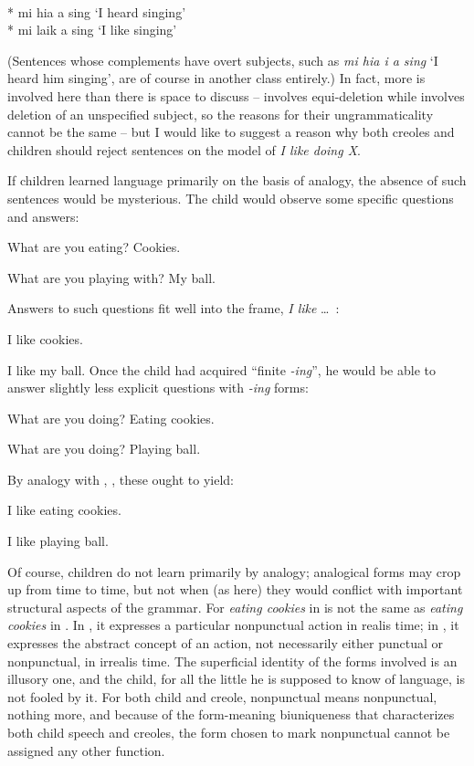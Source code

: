 \ea\label{ex:3:41}
\\
* mi hia a sing
\glt `I heard singing'
\z
\ea\label{ex:3:42}
\\
* mi laik a sing
\glt `I like singing'
\z

\noindent (Sentences whose complements have overt subjects, such as \textit{mi hia i a sing} `I heard him singing', are of course in another class entirely.) In fact, more is involved here than there is space to discuss --  involves equi-deletion while  involves deletion of an unspecified subject, so the reasons for their ungrammaticality cannot be the same -- but I would like to suggest a reason why both creoles and children should reject sentences on the model of \textit{I like doing X}.

If children learned language primarily on the basis of analogy, the absence of such sentences would be mysterious. The child would observe some specific questions and answers:

\ea\label{ex:3:43}
What are you eating? Cookies.
\z

\ea\label{ex:3:44}
 What are you playing with? My ball.
\z

\noindent Answers to such questions fit well into the frame, \textit{I like} \ldots~:

\ea\label{ex:3:45}
 I like cookies.
\z

\ea\label{ex:3:46}
I like my ball.
\z
Once the child had acquired ``finite \textit{-ing}'', he would be able to answer slightly less explicit questions with \textit{-ing} forms:

\ea\label{ex:3:47}
 What are you doing? Eating cookies.
\z

\ea\label{ex:3:48}
 What are you doing? Playing ball.
\z

\noindent By analogy with , , these ought to yield:

\ea\label{ex:3:49}
 I like eating cookies. 
\z

\ea\label{ex:3:50}
 I like playing ball. 
\z

Of course, children do not learn primarily by analogy; analogical
forms may crop up from time to time, but not when (as here) they would conflict with important structural aspects of the grammar. For \textit{eating cookies} in  is not the same as \textit{eating cookies} in . In , it expresses a particular nonpunctual action in realis time; in , it expresses the abstract concept of an action, not necessarily either punctual or nonpunctual, in irrealis time. The superficial identity of the forms involved is an illusory one, and the child, for all the little he is supposed to know of language, is not fooled by it. For both child and creole, nonpunctual means nonpunctual, nothing more, and because of the form-meaning biuniqueness that characterizes both child speech and creoles, the form chosen to mark nonpunctual cannot be assigned any other function.

